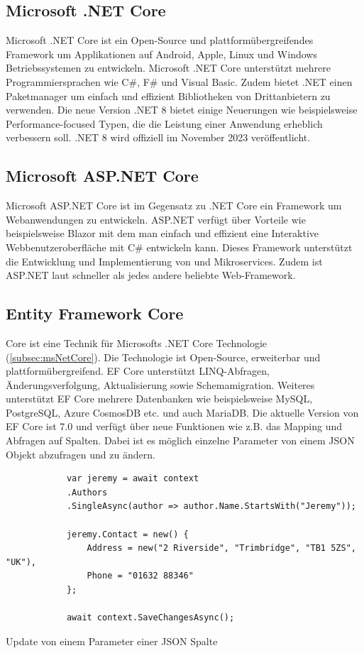 \documentclass[a4paper, fontsize=11pt, parskip=half, twoside]{scrreprt}
\begin{document}
	\subsection{Microsoft .NET Core} \label{subsec:msNetCore}
	Microsoft .NET Core ist ein Open-Source und plattformübergreifendes Framework um Applikationen auf Android, Apple, Linux und Windows Betriebssystemen zu entwickeln.
	Microsoft .NET Core unterstützt mehrere Programmiersprachen wie C\#, F\# und Visual Basic.
	Zudem bietet .NET einen Paketmanager um einfach und effizient Bibliotheken von Drittanbietern zu verwenden.
	Die neue Version .NET 8 bietet einige Neuerungen wie beispielsweise Performance-focused Typen, die die Leistung einer Anwendung erheblich verbessern soll.
	.NET 8 wird offiziell im November 2023 veröffentlicht.
	
	\textcite{billwagner_net_nodate}
	
	\subsection{Microsoft ASP.NET Core}
	Microsoft ASP.NET Core ist im Gegensatz zu .NET Core ein Framework um Webanwendungen zu entwickeln. 
	ASP.NET verfügt über Vorteile wie beispielsweise Blazor mit dem man einfach und effizient eine Interaktive Webbenutzeroberfläche mit C\# entwickeln kann.
	Dieses Framework unterstützt die Entwicklung und Implementierung von  und Mikroservices.
	Zudem ist ASP.NET laut \textcite{noauthor_techempower_nodate} schneller als jedes andere beliebte Web-Framework.
	
	\textcite{billwagner_net_nodate}
	
	\subsection{Entity Framework Core}
	 Core ist eine  Technik für Microsofts .NET Core Technologie (\autoref{subsec:msNetCore}). 
	Die Technologie ist Open-Source, erweiterbar und plattformübergreifend.
	\ac{EF} Core unterstützt LINQ-Abfragen, Änderungsverfolgung, Aktualisierung sowie Schemamigration.
	Weiteres unterstützt \ac{EF} Core mehrere Datenbanken wie beispielsweise MySQL, PostgreSQL, Azure CosmosDB etc. und auch MariaDB.
	Die aktuelle Version von \ac{EF} Core ist 7.0 und verfügt über neue Funktionen wie z.B. das Mapping und Abfragen auf  Spalten. 
	Dabei ist es möglich einzelne Parameter von einem \ac{JSON} Objekt abzufragen und zu ändern.
	
	\begin{listing}[ht]
		\begin{verbatim}
			var jeremy = await context
			.Authors
			.SingleAsync(author => author.Name.StartsWith("Jeremy"));
			
			jeremy.Contact = new() { 
				Address = new("2 Riverside", "Trimbridge", "TB1 5ZS", "UK"), 
				Phone = "01632 88346" 
			};
		
			await context.SaveChangesAsync();
		\end{verbatim}
		\caption{Update von einem Parameter einer \ac{JSON} Spalte}
	\end{listing}
\end{document}
